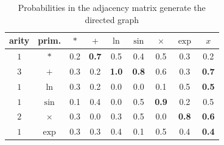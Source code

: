 \documentclass[12pt]{article}
\begin{document}


\begin{table}[!htp]
    \centering
        \caption{Probabilities in the adjacency matrix generate the directed graph}
        \begin{tabular}{|c|c|ccccccc|}
            \hline
            arity&prim.&$\ast$&$+$&$\ln$&$\sin$&$\times$&$\exp$&$x$\\
            \hline
            $1$&$\ast$ &0.2&{\bf 0.7}&0.5&0.4&0.5&0.3&0.2\\
            $3$&$+$    &0.3&0.2&{\bf 1.0}&{\bf 0.8}&0.6&0.3&{\bf 0.7}\\
            $1$&$\ln$  &0.3&0.2&0.0&0.0&0.1&0.5&{\bf 0.5}\\
            $1$&$\sin$ &0.1&0.4&0.0&0.5&{\bf 0.9}&0.2&0.5\\
            $2$&$\times$&0.3&0.0&0.3&0.5&0.0&{\bf 0.8}&{\bf 0.6}\\
            $1$&$\exp$ &0.3&0.3&0.4&0.1&0.5&0.4&{\bf 0.4}\\
            \hline
        \end{tabular}
    \label{restored_adjacency_matrix}
\end{table}
\end{document}
